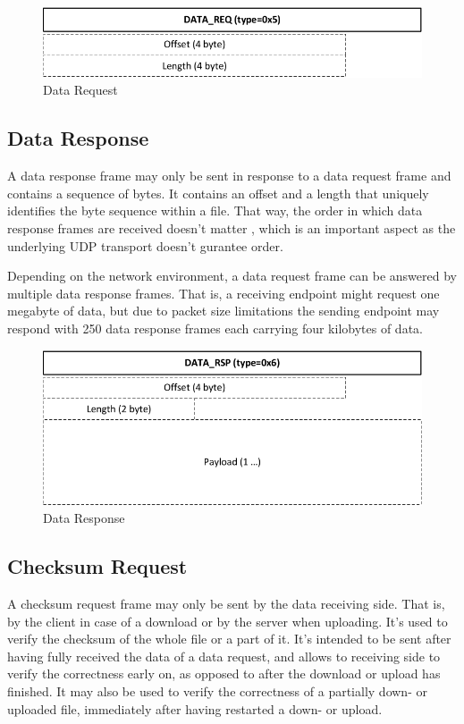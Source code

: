 \documentclass[]{article}
\begin{document}
\begin{figure}[H]
\centering
\includegraphics[width=\textwidth]{frames/data-req.pdf}
\caption{Data Request}
\label{DATA-REQ}
\end{figure}

\subsection{Data Response}

A data response frame may only be sent in response to a data request frame and
contains a sequence of bytes. It contains an offset and a length that uniquely identifies the byte sequence
within a file. That way, the order in which data response frames are received doesn't matter
, which is an important aspect as the underlying UDP transport doesn't gurantee order.

Depending on the network environment, a data request frame can be answered by multiple
data response frames. That is, a receiving endpoint might request one megabyte of data, but
due to packet size limitations the sending endpoint may respond with 250 data response
frames each carrying four kilobytes of data.
 
\begin{figure}[H]
\centering
\includegraphics[width=\textwidth]{frames/data-rsp.pdf}
\caption{Data Response}
\label{DATA-RSP}
\end{figure}

\subsection{Checksum Request}
A checksum request frame may only be sent by the data receiving side. That is, by the client
in case of a download or by the server when uploading. It's used to verify the checksum of
the whole file or a part of it. It's intended to be sent after having fully received
the data of a data request, and allows to receiving side to verify the correctness early
on, as opposed to after the download or upload has finished. It may also be used to verify 
the correctness of a partially down- or uploaded file, immediately after having restarted
a down- or upload. 
\end{document}
